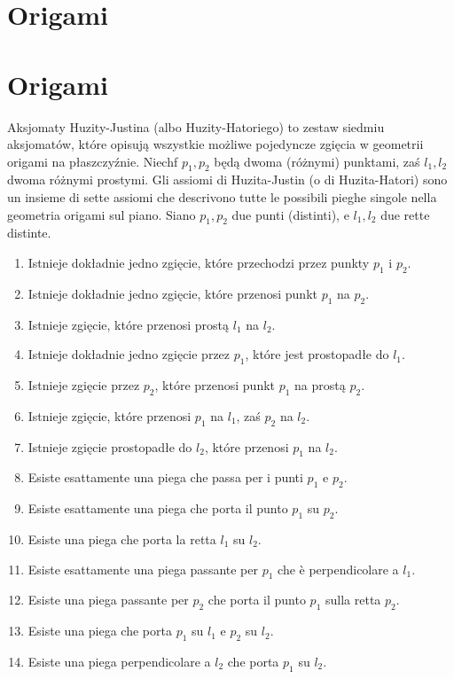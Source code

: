 
%

\section{Origami} %
\section{Origami} %
\label{section_origami}

Aksjomaty Huzity-Justina (albo Huzity-Hatoriego) to zestaw siedmiu aksjomatów, które opisują wszystkie możliwe pojedyncze zgięcia w geometrii origami na płaszczyźnie. %
Niechf $p_1, p_2$ będą dwoma (różnymi) punktami, zaś $l_1, l_2$ dwoma różnymi prostymi. %
Gli assiomi di Huzita-Justin (o di Huzita-Hatori) sono un insieme di sette assiomi che descrivono tutte le possibili pieghe singole nella geometria origami sul piano. %
Siano $p_1, p_2$ due punti (distinti), e $l_1, l_2$ due rette distinte. %

\begin{enumerate}
    \item Istnieje dokładnie jedno zgięcie, które przechodzi przez punkty $p_1$ i $p_2$. %
    \item Istnieje dokładnie jedno zgięcie, które przenosi punkt $p_1$ na $p_2$. %
    \item Istnieje zgięcie, które przenosi prostą $l_1$ na $l_2$. %
    \item Istnieje dokładnie jedno zgięcie przez $p_1$, które jest prostopadłe do $l_1$. %
    \item Istnieje zgięcie przez $p_2$, które przenosi punkt $p_1$ na prostą $p_2$. %
    \item Istnieje zgięcie, które przenosi $p_1$ na $l_1$, zaś $p_2$ na $l_2$. %
    \item Istnieje zgięcie prostopadłe do $l_2$, które przenosi $p_1$ na $l_2$. %
    \item Esiste esattamente una piega che passa per i punti $p_1$ e $p_2$. %
    \item Esiste esattamente una piega che porta il punto $p_1$ su $p_2$. %
    \item Esiste una piega che porta la retta $l_1$ su $l_2$. %
    \item Esiste esattamente una piega passante per $p_1$ che è perpendicolare a $l_1$. %
    \item Esiste una piega passante per $p_2$ che porta il punto $p_1$ sulla retta $p_2$. %
    \item Esiste una piega che porta $p_1$ su $l_1$ e $p_2$ su $l_2$. %
    \item Esiste una piega perpendicolare a $l_2$ che porta $p_1$ su $l_2$. %
\end{enumerate}

